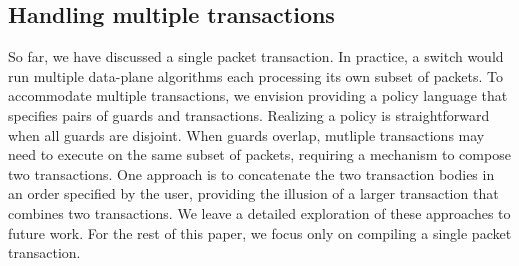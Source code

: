 \subsection{Handling multiple transactions}
\label{ss:multiple}
So far, we have discussed a single packet transaction. In practice, a switch
would run multiple data-plane algorithms each processing its own subset of
packets. To accommodate multiple transactions, we envision providing a policy
language that specifies pairs of guards and transactions. Realizing a policy is
straightforward when all guards are disjoint. When guards overlap, mutliple
transactions may need to execute on the same subset of packets, requiring a
mechanism to compose two transactions. One approach is to concatenate the two
transaction bodies in an order specified by the user, providing the illusion of
a larger transaction that combines two transactions. We leave a detailed
exploration of these approaches to future work. For the rest of this paper, we
focus only on compiling a single packet transaction.
